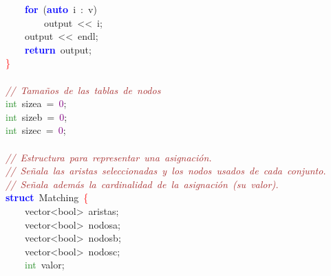 \mbox{}\ \ \ \ \textbf{\textcolor{Blue}{for}}\ \textcolor{BrickRed}{(}\textbf{\textcolor{Blue}{auto}}\ i\ \textcolor{BrickRed}{:}\ v\textcolor{BrickRed}{)} \\
\mbox{}\ \ \ \ \ \ \ \ output\ \textcolor{BrickRed}{\textless{}\textless{}}\ i\textcolor{BrickRed}{;} \\
\mbox{}\ \ \ \ output\ \textcolor{BrickRed}{\textless{}\textless{}}\ endl\textcolor{BrickRed}{;} \\
\mbox{}\ \ \ \ \textbf{\textcolor{Blue}{return}}\ output\textcolor{BrickRed}{;} \\
\mbox{}\textcolor{Red}{\}} \\
\mbox{} \\
\mbox{}\textit{\textcolor{Brown}{//\ Tamaños\ de\ las\ tablas\ de\ nodos}} \\
\mbox{}\textcolor{ForestGreen}{int}\ sizea\ \textcolor{BrickRed}{=}\ \textcolor{Purple}{0}\textcolor{BrickRed}{;} \\
\mbox{}\textcolor{ForestGreen}{int}\ sizeb\ \textcolor{BrickRed}{=}\ \textcolor{Purple}{0}\textcolor{BrickRed}{;} \\
\mbox{}\textcolor{ForestGreen}{int}\ sizec\ \textcolor{BrickRed}{=}\ \textcolor{Purple}{0}\textcolor{BrickRed}{;} \\
\mbox{} \\
\mbox{}\textit{\textcolor{Brown}{//\ Estructura\ para\ representar\ una\ asignación.}} \\
\mbox{}\textit{\textcolor{Brown}{//\ Señala\ las\ aristas\ seleccionadas\ y\ los\ nodos\ usados\ de\ cada\ conjunto.}} \\
\mbox{}\textit{\textcolor{Brown}{//\ Señala\ además\ la\ cardinalidad\ de\ la\ asignación\ (su\ valor).}} \\
\mbox{}\textbf{\textcolor{Blue}{struct}}\ \textcolor{TealBlue}{Matching}\ \textcolor{Red}{\{} \\
\mbox{}\ \ \ \ \textcolor{TealBlue}{vector\textless{}bool\textgreater{}}\ aristas\textcolor{BrickRed}{;} \\
\mbox{}\ \ \ \ \textcolor{TealBlue}{vector\textless{}bool\textgreater{}}\ nodosa\textcolor{BrickRed}{;} \\
\mbox{}\ \ \ \ \textcolor{TealBlue}{vector\textless{}bool\textgreater{}}\ nodosb\textcolor{BrickRed}{;} \\
\mbox{}\ \ \ \ \textcolor{TealBlue}{vector\textless{}bool\textgreater{}}\ nodosc\textcolor{BrickRed}{;} \\
\mbox{}\ \ \ \ \textcolor{ForestGreen}{int}\ valor\textcolor{BrickRed}{;} \\
